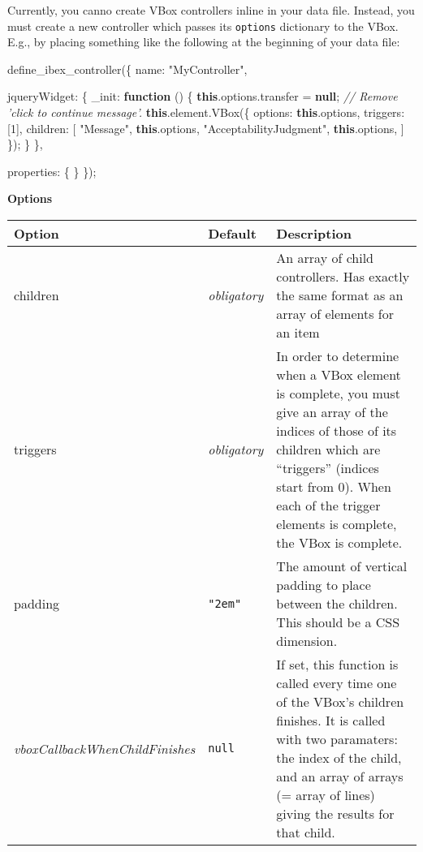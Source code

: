 \documentclass[]{article}
\newenvironment{Shaded}{}{}
\newcommand{\KeywordTok}[1]{\textcolor[rgb]{0.00,0.44,0.13}{\textbf{{#1}}}}
\newcommand{\DataTypeTok}[1]{\textcolor[rgb]{0.56,0.13,0.00}{{#1}}}
\newcommand{\DecValTok}[1]{\textcolor[rgb]{0.25,0.63,0.44}{{#1}}}
\newcommand{\StringTok}[1]{\textcolor[rgb]{0.25,0.44,0.63}{{#1}}}
\newcommand{\CommentTok}[1]{\textcolor[rgb]{0.38,0.63,0.69}{\textit{{#1}}}}
\newcommand{\OtherTok}[1]{\textcolor[rgb]{0.00,0.44,0.13}{{#1}}}
\newcommand{\FunctionTok}[1]{\textcolor[rgb]{0.02,0.16,0.49}{{#1}}}
\newcommand{\NormalTok}[1]{{#1}}
\begin{document}
Currently, you canno create VBox controllers inline in your data file.
Instead, you must create a new controller which passes its
\texttt{options} dictionary to the VBox. E.g., by placing something like
the following at the beginning of your data file:

\begin{Shaded}
\begin{Highlighting}[]
\FunctionTok{define_ibex_controller}\NormalTok{(\{}
    \DataTypeTok{name}\NormalTok{: }\StringTok{"MyController"}\NormalTok{,}

    \DataTypeTok{jqueryWidget}\NormalTok{: \{}
        \DataTypeTok{_init}\NormalTok{: }\KeywordTok{function} \NormalTok{() \{}
            \KeywordTok{this}\NormalTok{.}\OtherTok{options}\NormalTok{.}\FunctionTok{transfer} \NormalTok{= }\KeywordTok{null}\NormalTok{; }\CommentTok{// Remove 'click to continue message'.}
            \KeywordTok{this}\NormalTok{.}\OtherTok{element}\NormalTok{.}\FunctionTok{VBox}\NormalTok{(\{}
                \DataTypeTok{options}\NormalTok{: }\KeywordTok{this}\NormalTok{.}\FunctionTok{options}\NormalTok{,}
                \DataTypeTok{triggers}\NormalTok{: [}\DecValTok{1}\NormalTok{],}
                \DataTypeTok{children}\NormalTok{: [}
                    \StringTok{"Message"}\NormalTok{, }\KeywordTok{this}\NormalTok{.}\FunctionTok{options}\NormalTok{,}
                    \StringTok{"AcceptabilityJudgment"}\NormalTok{, }\KeywordTok{this}\NormalTok{.}\FunctionTok{options}\NormalTok{,}
                \NormalTok{]}
            \NormalTok{\});}
        \NormalTok{\}}
    \NormalTok{\},}

    \DataTypeTok{properties}\NormalTok{: \{ \}}
\NormalTok{\});}
\end{Highlighting}
\end{Shaded}

\textbf{Options}

\begin{longtable}[c]{p{1in}p{1in}p{3.85in}}
\toprule
\textbf{Option} & \textbf{Default} & \textbf{Description}\tabularnewline
\midrule
\endhead
children & \emph{obligatory} & An array of child controllers. Has
exactly the same format as an array of elements for an
item\tabularnewline
triggers & \emph{obligatory} & In order to determine when a VBox element
is complete, you must give an array of the indices of those of its
children which are ``triggers'' (indices start from 0). When each of the
trigger elements is complete, the VBox is complete.\tabularnewline
padding & \texttt{"2em"} & The amount of vertical padding to place
between the children. This should be a CSS dimension.\tabularnewline
\emph{vboxCallbackWhenChildFinishes} & \texttt{null} & If set, this
function is called every time one of the VBox's children finishes. It is
called with two paramaters: the index of the child, and an array of
arrays (= array of lines) giving the results for that
child.\tabularnewline
\bottomrule
\end{longtable}
\end{document}
